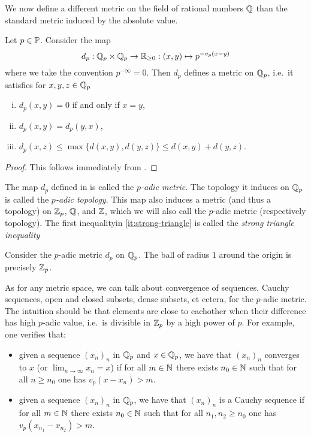 \documentclass[12pt, leqno, british]{amsart}
\begin{document}
We now define a different metric on the field of rational numbers $\mathbb Q$ than the standard metric induced by the absolute value.
\begin{prop}\label{P:p-adic-metric}
Let $p \in \mathbb P$.
Consider the map
$$ d_p : \mathbb Q_p \times \mathbb Q_p \to \mathbb R_{\geq 0} : (x, y) \mapsto p^{-v_p(x-y)}$$
where we take the convention $p^{-\infty} = 0$.
Then $d_p$ defines a metric on $\mathbb Q_p$, i.e.~it satisfies for $x, y, z \in \mathbb Q_p$
\begin{enumerate}[(i)]
\item $d_p(x, y) = 0$ if and only if $x = y$,
\item $d_p(x, y) = d_p(y, x)$,
\item\label{it:strong-triangle} $d_p(x, z) \leq \max \lbrace d(x, y), d(y, z) \rbrace \leq d(x, y) + d(y, z)$.
\end{enumerate}
\end{prop}
\begin{proof}
This follows immediately from .
\end{proof}
\begin{defi}
The map $d_p$ defined in  is called the \emph{$p$-adic metric}.
The topology it induces on $\mathbb Q_p$ is called the \emph{$p$-adic topology}.
This map also induces a metric (and thus a topology) on $\mathbb Z_p$, $\mathbb Q$, and $\mathbb Z$, which we will also call the $p$-adic metric (respectively topology).
The first inequalityin \eqref{it:strong-triangle} is called the \emph{strong triangle inequality}
\end{defi}
\begin{eg}
Consider the $p$-adic metric $d_p$ on $\mathbb Q_p$. The ball of radius $1$ around the origin is precisely $\mathbb Z_p$.
\end{eg}
As for any metric space, we can talk about convergence of sequences, Cauchy sequences, open and closed subsets, dense subsets, et cetera, for the $p$-adic metric.
The intuition should be that elements are close to eachother when their difference has high $p$-adic value, i.e.~is divisible in $\mathbb Z_p$ by a high power of $p$.
For example, one verifies that:
\begin{itemize}
\item given a sequence $(x_n)_n$ in $\mathbb Q_p$ and $x \in \mathbb Q_p$, we have that $(x_n)_n$ converges to $x$ (or $\lim_{n \to \infty} x_n = x$) if for all $m \in \mathbb N$ there exists $n_0 \in \mathbb N$ such that for all $n \geq n_0$ one has $v_p(x - x_n) > m$.
\item given a sequence $(x_n)_n$ in $\mathbb Q_p$, we have that $(x_n)_n$ is a Cauchy sequence if for all $m \in \mathbb N$ there exists $n_0 \in \mathbb N$ such that for all $n_1, n_2 \geq n_0$ one has $v_p(x_{n_1} - x_{n_2}) > m$.
\end{itemize}
\end{document}
